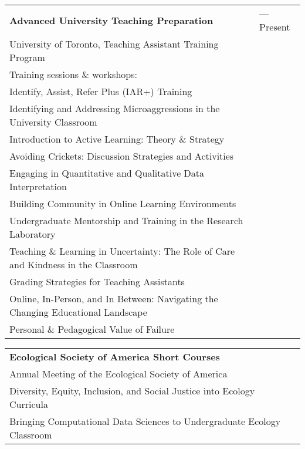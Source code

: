 \documentclass[letterpaper,11pt,oneside]{article}
\begin{document}
\def\arraystretch{1.1}
\noindent \begin{longtable}{@{} >{\raggedright\arraybackslash}p{15.5cm} >{\raggedright\arraybackslash}p{1.7cm}}

 \textbf{Advanced University Teaching Preparation}  & 2021---Present\\
University of Toronto, Teaching Assistant Training Program \\
Training sessions \& workshops: & \\
  \hspace{5mm} Identify, Assist, Refer Plus (IAR+) Training & \\
  \hspace{5mm} Identifying and Addressing Microaggressions in the University Classroom & \\
  \hspace{5mm} Introduction to Active Learning: Theory \& Strategy & \\
  \hspace{5mm} Avoiding Crickets: Discussion Strategies and Activities & \\
  \hspace{5mm} Engaging in Quantitative and Qualitative Data Interpretation & \\
  \hspace{5mm} Building Community in Online Learning Environments & \\
  \hspace{5mm} Undergraduate Mentorship and Training in the Research Laboratory & \\
  \hspace{5mm} Teaching \& Learning in Uncertainty: The Role of Care and Kindness in the Classroom & \\
  \hspace{5mm} Grading Strategies for Teaching Assistants & \\
  \hspace{5mm} Online, In-Person, and In Between: Navigating the Changing Educational Landscape & \\
  \hspace{5mm} Personal \& Pedagogical Value of Failure & \\
\end{longtable}

\def\arraystretch{1.1}
\noindent \begin{longtable}{@{} >{\raggedright\arraybackslash}p{15.5cm} >{\raggedright\arraybackslash}p{1.7cm}}

 \textbf{Ecological Society of America Short Courses}  & 2021\\
Annual Meeting of the Ecological Society of America & \\
  \hspace{5mm} Diversity, Equity, Inclusion, and Social Justice into Ecology Curricula & \\
  \hspace{5mm} Bringing Computational Data Sciences to Undergraduate Ecology Classroom & \\
\end{longtable}
\end{document}
